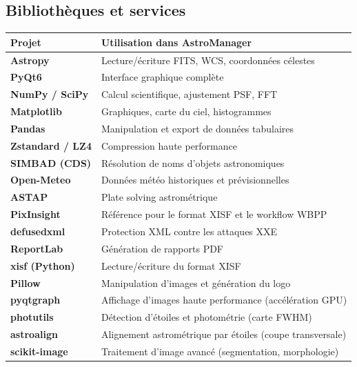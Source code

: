 \documentclass[a4paper,11pt]{article}
\begin{document}
\subsection{Biblioth\`{e}ques et services}

\begin{center}
\begin{tabularx}{\textwidth}{l X}
\toprule
\textbf{Projet} & \textbf{Utilisation dans AstroManager} \\
\midrule
\textbf{Astropy} & Lecture/\'{e}criture FITS, WCS, coordonn\'{e}es c\'{e}lestes \\
\textbf{PyQt6} & Interface graphique compl\`{e}te \\
\textbf{NumPy / SciPy} & Calcul scientifique, ajustement PSF, FFT \\
\textbf{Matplotlib} & Graphiques, carte du ciel, histogrammes \\
\textbf{Pandas} & Manipulation et export de donn\'{e}es tabulaires \\
\textbf{Zstandard / LZ4} & Compression haute performance \\
\textbf{SIMBAD (CDS)} & R\'{e}solution de noms d'objets astronomiques \\
\textbf{Open-Meteo} & Donn\'{e}es m\'{e}t\'{e}o historiques et pr\'{e}visionnelles \\
\textbf{ASTAP} & Plate solving astrom\'{e}trique \\
\textbf{PixInsight} & R\'{e}f\'{e}rence pour le format XISF et le workflow WBPP \\
\textbf{defusedxml} & Protection XML contre les attaques XXE \\
\textbf{ReportLab} & G\'{e}n\'{e}ration de rapports PDF \\
\textbf{xisf (Python)} & Lecture/\'{e}criture du format XISF \\
\textbf{Pillow} & Manipulation d'images et g\'{e}n\'{e}ration du logo \\
\textbf{pyqtgraph} & Affichage d'images haute performance (acc\'{e}l\'{e}ration GPU) \\
\textbf{photutils} & D\'{e}tection d'\'{e}toiles et photom\'{e}trie (carte FWHM) \\
\textbf{astroalign} & Alignement astrom\'{e}trique par \'{e}toiles (coupe transversale) \\
\textbf{scikit-image} & Traitement d'image avanc\'{e} (segmentation, morphologie) \\
\bottomrule
\end{tabularx}
\end{center}
\end{document}
